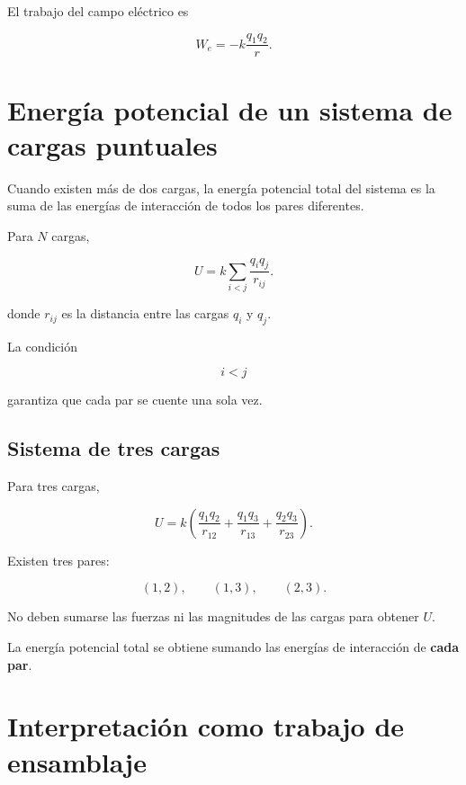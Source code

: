 El trabajo del campo eléctrico es

\[
\boxed{
W_e=-k\frac{q_1q_2}{r}
}.
\]


\section{Energía potencial de un sistema de cargas puntuales}

Cuando existen más de dos cargas, la energía potencial total del sistema es la suma
de las energías de interacción de todos los pares diferentes.

Para \(N\) cargas,

\begin{equation}
\boxed{
U
=
k\sum_{i<j}
\frac{q_iq_j}{r_{ij}}
}.
\label{eq:energia_sistema_cargas}
\end{equation}

donde \(r_{ij}\) es la distancia entre las cargas \(q_i\) y \(q_j\).

La condición

\[
i<j
\]

garantiza que cada par se cuente una sola vez.


\subsection{Sistema de tres cargas}

Para tres cargas,

\begin{equation}
\boxed{
U
=
k
\left(
\frac{q_1q_2}{r_{12}}
+
\frac{q_1q_3}{r_{13}}
+
\frac{q_2q_3}{r_{23}}
\right)
}.
\label{eq:energia_tres_cargas}
\end{equation}

Existen tres pares:

\[
(1,2),\qquad(1,3),\qquad(2,3).
\]

\begin{advertencia}

No deben sumarse las fuerzas ni las magnitudes de las cargas para obtener \(U\).

La energía potencial total se obtiene sumando las energías de interacción de
\textbf{cada par}.

\end{advertencia}


\section{Interpretación como trabajo de ensamblaje}

